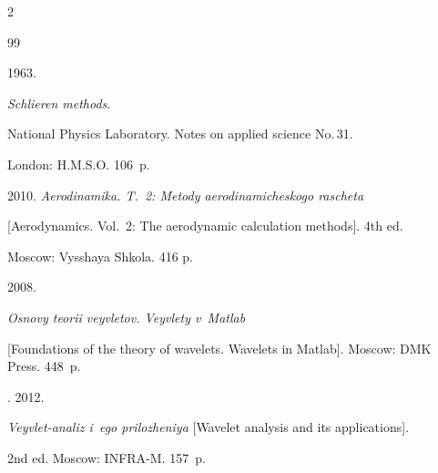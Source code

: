 










  \begin{multicols}{2}



\renewcommand{\bibname}{\protect\rmfamily References}




{\small\frenchspacing

 {%


 \begin{thebibliography}{99}




 1963.

\textit{Schlieren methods}.

    National Physics Laboratory. Notes on applied science No.\,31.

    London: H.M.S.O. 106~p.


 2010. \textit{Aerodinamika. T.~2: Metody aerodinamicheskogo rascheta}

[Aerodynamics. Vol.~2: The aerodynamic calculation methods].  4th ed. 

Moscow: Vysshaya Shkola. 416 p.




 2008. 

\textit{Osnovy teorii veyvletov. Veyvlety v~Matlab} 

[Foundations of the theory of wavelets. Wavelets in Matlab]. Moscow: DMK Press. 448~p.


. 2012.

\textit{Veyvlet-analiz i~ego prilozheniya} [Wavelet analysis and its applications]. 

2nd ed. Moscow: INFRA-M. 157~p.




\end{thebibliography}}}
\end{multicols}
